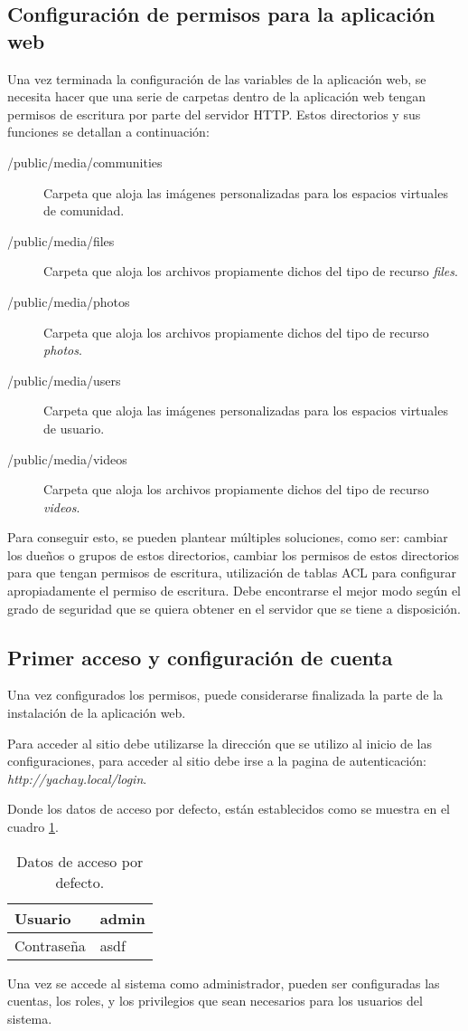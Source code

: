\subsection{Configuración de permisos para la aplicación web}
Una vez terminada la configuración de las variables de la aplicación web, se
necesita hacer que una serie de carpetas dentro de la aplicación web tengan
permisos de escritura por parte del servidor HTTP. Estos directorios y sus
funciones se detallan a continuación:

\begin{description}
\item [/public/media/communities] Carpeta que aloja las imágenes personalizadas
para los espacios virtuales de comunidad.
\item [/public/media/files] Carpeta que aloja los archivos propiamente dichos
del tipo de recurso \emph{files}.
\item [/public/media/photos] Carpeta que aloja los archivos propiamente dichos
del tipo de recurso \emph{photos}.
\item [/public/media/users] Carpeta que aloja las imágenes personalizadas
para los espacios virtuales de usuario.
\item [/public/media/videos] Carpeta que aloja los archivos propiamente dichos
del tipo de recurso \emph{videos}.
\end{description}

Para conseguir esto, se pueden plantear múltiples soluciones, como ser: cambiar
los dueños o grupos de estos directorios, cambiar los permisos de estos
directorios para que tengan permisos de escritura, utilización de tablas ACL
para configurar apropiadamente el permiso de escritura. Debe encontrarse el
mejor modo según el grado de seguridad que se quiera obtener en el servidor que
se tiene a disposición.

\subsection{Primer acceso y configuración de cuenta}
Una vez configurados los permisos, puede considerarse finalizada la parte de la
instalación de la aplicación web.

Para acceder al sitio debe utilizarse la dirección que se utilizo al inicio de
las configuraciones, para acceder al sitio debe irse a la pagina de
autenticación: \emph{http://yachay.local/login}.

Donde los datos de acceso por defecto, están establecidos como se muestra en el
cuadro \ref{yachay_auth}.

\begin{table}
\centering
\begin{tabular}{|l|l|}
\hline
Usuario     & admin \\
\hline
Contraseña  & asdf \\
\hline
\end{tabular}
\caption{Datos de acceso por defecto.}
\label{yachay_auth}
\end{table}

Una vez se accede al sistema como administrador, pueden ser configuradas las
cuentas, los roles, y los privilegios que sean necesarios para los usuarios del
sistema.

